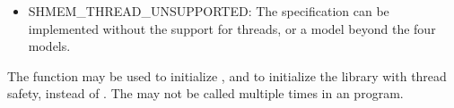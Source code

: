 \begin{apidefinition}
{\begin{itemize}
\item SHMEM\_THREAD\_UNSUPPORTED: The \openshmem{} specification 
can be implemented without the support for threads, or a model beyond the four
models.
   
\end{itemize}

The function may be used to initialize \openshmem{}, and to initialize the
\openshmem{} library with thread safety, instead of . The
may not be called multiple times in an \openshmem{} program.
}




\end{apidefinition}

 
  
